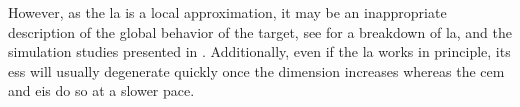 However, as the \gls{la} is a local approximation, it may be an inappropriate description of the global behavior of the target, see  for a breakdown of \gls{la}, and the simulation studies presented in . 
Additionally, even if the \gls{la} works in principle, its \gls{ess} will usually degenerate quickly once the dimension increases whereas the \gls{cem} and \gls{eis} do so at a slower pace.


